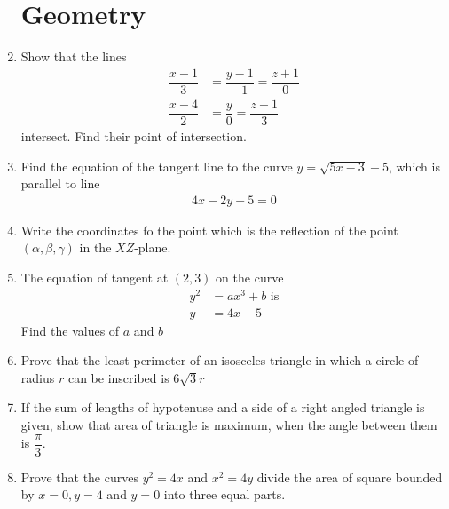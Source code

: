 \documentclass[12pt,-letter paper]{article}
\theoremstyle{remark}
\providecommand{\brak}[1]{\ensuremath{\left(#1\right)}}
\begin{document}
\begin{enumerate}
            \section{Geometry}
      \item Show that the lines
            \begin{align*}
                  \dfrac{x-1}{3} & = \dfrac{y-1}{-1} = \dfrac{z+1}{0} \\
                  \dfrac{x-4}{2} & = \dfrac{y}{0} = \dfrac{z+1}{3}
            \end{align*}
            intersect. Find their point of intersection.
      \item Find the equation of the tangent line to the curve $y=\sqrt{5x-3} -5$, which is parallel to line
            \begin{align*}
                  4x-2y+5=0
            \end{align*}
      \item Write the coordinates fo the point which is the reflection of the point \brak{\alpha,\beta,\gamma} in the $XZ$-plane.
      \item The equation of tangent at \brak{2,3} on the curve
            \begin{align*}
                  y^2 & = ax^3 + b \text { is} \\
                  y   & = 4x -5
            \end{align*}
            Find the values of $a$ and $b$
      \item Prove that the least perimeter of an isosceles triangle in which a circle of radius $r$ can be inscribed is $6 \sqrt{3} r$
      \item If the sum of lengths of hypotenuse and a side of a right angled triangle is given, show that area of triangle is maximum, when the angle between them is $\dfrac{\pi}{3}$.
      \item Prove that the curves $y^2=4x$ and $x^2= 4y$ divide the area of square bounded by $x=0,y=4$ and $y=0$ into three equal parts.

\end{enumerate}
\end{document}
